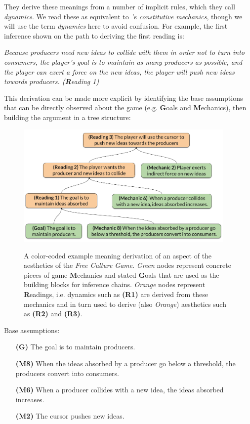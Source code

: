 \documentclass[a4paper]{article}
\begin{document}
They derive these meanings from a number of implicit rules, which they call
\emph{dynamics}. We read these as equivalent to~\cite{salen2004rules}'s
\emph{constitutive mechanics}, though we will use the term \emph{dynamics}
here to avoid confusion. For example, the first inference shown on the path to deriving the first reading is:

{\em Because producers need new ideas to collide with them in order not to
turn into consumers, the player's goal is to maintain as many producers as
possible, and the player can exert a force on the new ideas, the player
will push new ideas towards producers. (\textbf{R}eading 1)}

This derivation can be made more explicit by identifying the base
assumptions that can be directly observed about the game (e.g. \textbf{G}oals and \textbf{M}echanics), then building the
argument in a tree structure:


\begin{figure}[ht]
\centering
\includegraphics[width=0.95\textwidth]{figures/Copy_of_Proceduralist_Reading.png}
\label{fig:free_culture}
\caption{A color-coded example meaning derivation of an aspect of the aesthetics of the \textit{Free Culture Game}.  \textit{Green} nodes represent concrete pieces of game \textbf{M}echanics and stated \textbf{G}oals that are used as the building blocks for inference chains.  \textit{Orange} nodes represent \textbf{R}eadings, i.e. dynamics such as \textbf{(R1)} are derived from these mechanics and in turn used to derive (also \textit{Orange}) aesthetics such as \textbf{(R2)} and \textbf{(R3)}.}
\end{figure}

Base assumptions:
\begin{itemize}
\item [\textbf{(G)}] The goal is to maintain producers.
\item [\textbf{(M8)}]When the ideas absorbed by a producer go below a threshold, the
producers convert into consumers.
\item [\textbf{(M6)}]When a producer collides with a new idea, the ideas absorbed
increases.
\item [\textbf{(M2)}] The cursor pushes new ideas.
\end{itemize}
\end{document}
